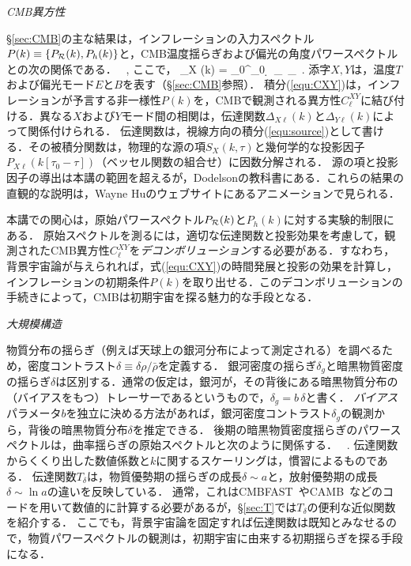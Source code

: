 \vskip 6pt
\noindent
{\it CMB異方性}

\S\ref{sec:CMB}の主な結果は，インフレーションの入力スペクトル$P(k) \equiv \{ P_{\cal R}(k), P_h(k) \}$と，CMB温度揺らぎおよび偏光の角度パワースペクトルとの次の関係である．
\beq
\label{equ:CXY}
\, ,
\eeq
ここで，
\beq
\label{equ:source}
\Delta_{X \ell}(k) = \int_0^{\tau_0} \d \tau\, _{}\, _{}\, .
\eeq
添字$X,Y$は，温度$T$および偏光モード$E$と$B$を表す（\S\ref{sec:CMB}参照）．
積分(\ref{equ:CXY})は，インフレーションが予言する非一様性$P(k)$を，CMBで観測される異方性$C_\ell^{XY}$に結び付ける．異なる$X$および$Y$モード間の相関は，伝達関数$\Delta_{X\ell}(k)$と$\Delta_{Y\ell}(k)$によって関係付けられる．
伝達関数は，視線方向の積分(\ref{equ:source})として書ける．その被積分関数は，物理的な源の項$S_X(k, \tau)$と幾何学的な投影因子$P_{X\ell}(k[\tau_0-\tau])$（ベッセル関数の組合せ）に因数分解される．
源の項と投影因子の導出は本講の範囲を超えるが，Dodelsonの教科書\cite{Dodelson}にある．これらの結果の直観的な説明は，Wayne Huのウェブサイト\cite{WayneHu}にあるアニメーションで見られる．

本講での関心は，原始パワースペクトル$P_{\cal R}(k)$と$P_h(k)$に対する実験的制限にある．
原始スペクトルを測るには，適切な伝達関数と投影効果を考慮して，観測されたCMB異方性$C_{\ell}^{XY}$を{\it デコンボリューション}する必要がある．すなわち，背景宇宙論が与えられれば，式(\ref{equ:CXY})の時間発展と投影の効果を計算し，インフレーションの初期条件$P(k)$を取り出せる．このデコンボリューションの手続きによって，CMBは初期宇宙を探る魅力的な手段となる．

\vskip 6pt
\noindent
{\it 大規模構造}

物質分布の揺らぎ（例えば天球上の銀河分布によって測定される）を調べるため，密度コントラスト$\delta \equiv \delta \rho/ \bar \rho$を定義する．
銀河密度の揺らぎ$\delta_g$と暗黒物質密度の揺らぎ$\delta$は区別する．通常の仮定は，銀河が，その背後にある暗黒物質分布の（バイアスをもつ）トレーサーであるというもので，$\delta_g = b\, \delta$と書く．
{\it バイアス}パラメータ$b$を独立に決める方法があれば，銀河密度コントラスト$\delta_g$の観測から，背後の暗黒物質分布$\delta$を推定できる．
後期の暗黒物質密度揺らぎのパワースペクトルは，曲率揺らぎの原始スペクトルと次のように関係する．
\beq
{}\, .
\eeq
伝達関数からくくり出した数値係数と$k$に関するスケーリングは，慣習によるものである．
伝達関数$T_\delta$は，物質優勢期の揺らぎの成長$\delta \sim a$と，放射優勢期の成長$\delta \sim \ln a$の違いを反映している．
通常，これは{\sf CMBFAST}~\cite{CMBFAST}や{\sf CAMB}~\cite{CAMB}などのコードを用いて数値的に計算する必要があるが，\S\ref{sec:T}では$T_\delta$の便利な近似関数を紹介する．
ここでも，背景宇宙論を固定すれば伝達関数は既知とみなせるので，物質パワースペクトルの観測は，初期宇宙に由来する初期揺らぎを探る手段になる．


